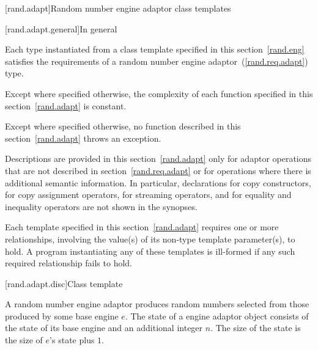 

[rand.adapt]{Random number engine adaptor class templates}

[rand.adapt.general]{In general}

\pnum
Each type instantiated
from a class template specified in this section~\ref{rand.eng}
satisfies the requirements
of a random number engine adaptor~(\ref{rand.req.adapt}) type.

\pnum
Except where specified otherwise,
the complexity of each function
specified in this section~\ref{rand.adapt}
is constant.

\pnum
Except
where specified otherwise,
no function described in this section~\ref{rand.adapt}
throws an exception.

\pnum
Descriptions are provided in this section~\ref{rand.adapt}
only for adaptor operations
that are not described in section~\ref{rand.req.adapt}
or for operations where there is additional semantic information.
In particular,
declarations for copy constructors,
for copy assignment operators,
for streaming operators,
and for equality and inequality operators
are not shown in the synopses.

\pnum
Each template specified in this section~\ref{rand.adapt}
requires one or more relationships,
involving the value(s) of its non-type template parameter(s), to hold.
A program instantiating any of these templates
is ill-formed
if any such required relationship fails to hold.


[rand.adapt.disc]{Class template }%
%

\pnum
A  random number engine adaptor
produces random numbers
selected from those produced by some base engine $e$.
The state%
%
of a  engine adaptor object 
consists of the state  of its base engine 
and an additional integer $n$.
The size of the state is
 the size of $e$'s state plus $1$.

